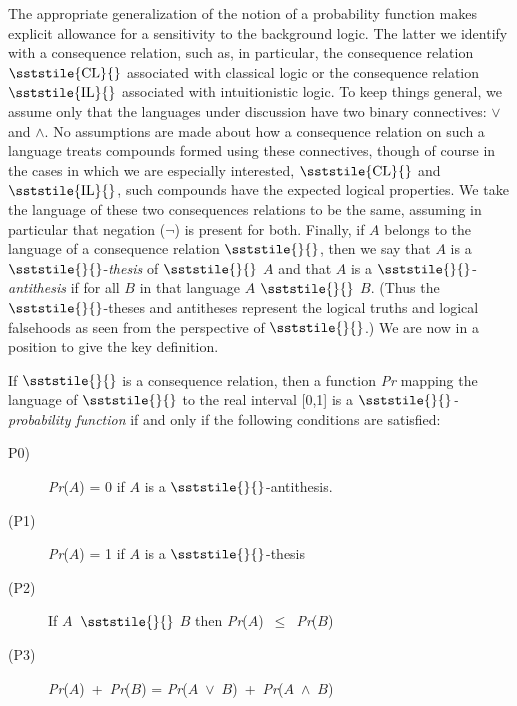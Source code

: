 The appropriate generalization of the notion of a probability function makes explicit allowance for a sensitivity to the background logic. The latter we identify with a consequence relation, such as, in particular, the consequence relation {\small \(\sststile{\mathrm{CL}}{}\)} associated with classical logic or the consequence relation {\small \(\sststile{\mathrm{IL}}{}\)} associated with intuitionistic logic. To keep things general, we assume only that the languages under discussion have two binary connectives: ${\vee}$ and ${\wedge}$. No assumptions are made about how a consequence relation on such a language treats compounds formed using these connectives, though of course in the cases in which we are especially interested, {\small \(\sststile{\mathrm{CL}}{}\)} and {\small \(\sststile{\mathrm{IL}}{}\)}, such compounds have the expected logical properties. We take the language of these two consequences relations to be the same, assuming in particular that negation (${\lnot}$) is present for both. Finally, if \(A\) belongs to the language of a consequence relation {\small \(\sststile{}{}\)}, then we say that \(A\) is a {\small \(\sststile{}{}\)}{}-\textit{thesis} of {\small \(\sststile{}{}\)} \(A\) and that \(A\) is a {\small \(\sststile{}{}\)}{}-\textit{antithesis} if for all \(B\) in that language \(A\) {\small \(\sststile{}{}\)} \(B\). (Thus the {\small \(\sststile{}{}\)}{}-theses and antitheses represent the logical truths and logical falsehoods as seen from the perspective of {\small \(\sststile{}{}\)}.) We are now in a position to give the key definition. 

If {\small \(\sststile{}{}\)} is a consequence relation, then a function \textit{Pr} mapping the language of {\small \(\sststile{}{}\)} to the real interval [0,1] is a {\small \(\sststile{}{}\)}\textit{{}-probability function} if and only if the following conditions are satisfied:

\begin{description}
\item[P0)]\textit{Pr}(\(A\)) = 0 if \(A\) is a {\small \(\sststile{}{}\)}{}-antithesis.
\item[(P1)]\textit{Pr}(\(A\)) = 1 if \(A\) is a {\small \(\sststile{}{}\)}{}-thesis
\item[(P2)]If \(A\)~{\small \(\sststile{}{}\)} \(B\) then \textit{Pr}(\(A\))~${\leq}$~\textit{Pr}(\(B\))
\item[(P3)]\textit{Pr}(\(A\))~+~\textit{Pr}(\(B\)) = \textit{Pr}(\(A\)~${\vee}$~\(B\))~+~\textit{Pr}(\(A\)~${\wedge}$~\(B\))
\end{description}


